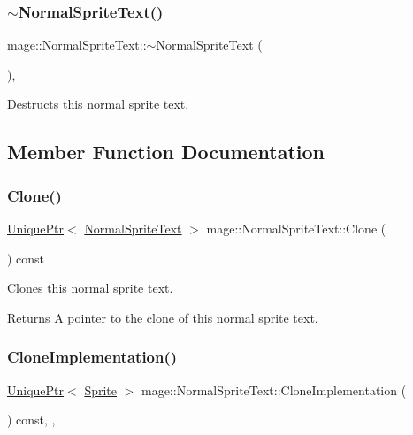 \subsubsection{\texorpdfstring{$\sim$\+Normal\+Sprite\+Text()}{~NormalSpriteText()}}
{\footnotesize\ttfamily mage\+::\+Normal\+Sprite\+Text\+::$\sim$\+Normal\+Sprite\+Text (\begin{DoxyParamCaption}{ }\end{DoxyParamCaption})\hspace{0.3cm}{\ttfamily [virtual]}, {\ttfamily [default]}}

Destructs this normal sprite text. 

\subsection{Member Function Documentation}
\hypertarget{classmage_1_1_normal_sprite_text_a8357ea517cff639204da4825024d9d34}{}\label{classmage_1_1_normal_sprite_text_a8357ea517cff639204da4825024d9d34} 
\subsubsection{\texorpdfstring{Clone()}{Clone()}}
{\footnotesize\ttfamily \hyperlink{namespacemage_a3316d7143a973e37adf1110f2e80ca31}{Unique\+Ptr}$<$ \hyperlink{classmage_1_1_normal_sprite_text}{Normal\+Sprite\+Text} $>$ mage\+::\+Normal\+Sprite\+Text\+::\+Clone (\begin{DoxyParamCaption}{ }\end{DoxyParamCaption}) const}

Clones this normal sprite text.

\begin{DoxyReturn}{Returns}
A pointer to the clone of this normal sprite text. 
\end{DoxyReturn}
\hypertarget{classmage_1_1_normal_sprite_text_acab5b61f8be4a475cd54b51278956e37}{}\label{classmage_1_1_normal_sprite_text_acab5b61f8be4a475cd54b51278956e37} 
\subsubsection{\texorpdfstring{Clone\+Implementation()}{CloneImplementation()}}
{\footnotesize\ttfamily \hyperlink{namespacemage_a3316d7143a973e37adf1110f2e80ca31}{Unique\+Ptr}$<$ \hyperlink{classmage_1_1_sprite}{Sprite} $>$ mage\+::\+Normal\+Sprite\+Text\+::\+Clone\+Implementation (\begin{DoxyParamCaption}{ }\end{DoxyParamCaption}) const\hspace{0.3cm}{\ttfamily [override]}, {\ttfamily [private]}, {\ttfamily [virtual]}}

